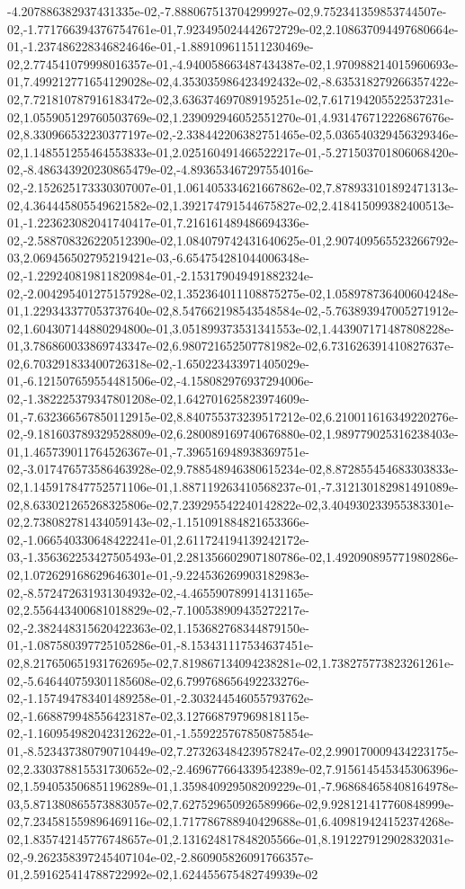 -4.207886382937431335e-02,-7.888067513704299927e-02,9.752341359853744507e-02,-1.771766394376754761e-01,7.923495024442672729e-02,2.108637094497680664e-01,-1.237486228346824646e-01,-1.889109611511230469e-02,2.774541079998016357e-01,-4.940058663487434387e-02,1.970988214015960693e-01,7.499212771654129028e-02,4.353035986423492432e-02,-8.635318279266357422e-02,7.721810787916183472e-02,3.636374697089195251e-02,7.617194205522537231e-02,1.055905129760503769e-02,1.239092946052551270e-01,4.931476712226867676e-02,8.330966532230377197e-02,-2.338442206382751465e-02,5.036540329456329346e-02,1.148551255464553833e-01,2.025160491466522217e-01,-5.271503701806068420e-02,-8.486343920230865479e-02,-4.893653467297554016e-02,-2.152625173330307007e-01,1.061405334621667862e-02,7.878933101892471313e-02,4.364445805549621582e-02,1.392174791544675827e-02,2.418415099382400513e-01,-1.223623082041740417e-01,7.216161489486694336e-02,-2.588708326220512390e-02,1.084079742431640625e-01,2.907409565523266792e-03,2.069456502795219421e-03,-6.654754281044006348e-02,-1.229240819811820984e-01,-2.153179049491882324e-02,-2.004295401275157928e-02,1.352364011108875275e-02,1.058978736400604248e-01,1.229343377053737640e-02,8.547662198543548584e-02,-5.763893947005271912e-02,1.604307144880294800e-01,3.051899373531341553e-02,1.443907171487808228e-01,3.786860033869743347e-02,6.980721652507781982e-02,6.731626391410827637e-02,6.703291833400726318e-02,-1.650223433971405029e-01,-6.121507659554481506e-02,-4.158082976937294006e-02,-1.382225379347801208e-02,1.642701625823974609e-01,-7.632366567850112915e-02,8.840755373239517212e-02,6.210011616349220276e-02,-9.181603789329528809e-02,6.280089169740676880e-02,1.989779025316238403e-01,1.465739011764526367e-01,-7.396516948938369751e-02,-3.017476573586463928e-02,9.788548946380615234e-02,8.872855454683303833e-02,1.145917847752571106e-01,1.887119263410568237e-01,-7.312130182981491089e-02,8.633021265268325806e-02,7.239295542240142822e-02,3.404930233955383301e-02,2.738082781434059143e-02,-1.151091884821653366e-02,-1.066540330648422241e-01,2.611724194139242172e-03,-1.356362253427505493e-01,2.281356602907180786e-02,1.492090895771980286e-02,1.072629168629646301e-01,-9.224536269903182983e-02,-8.572472631931304932e-02,-4.465590789914131165e-02,2.556443400681018829e-02,-7.100538909435272217e-02,-2.382448315620422363e-02,1.153682768344879150e-01,-1.087580397725105286e-01,-8.153431117534637451e-02,8.217650651931762695e-02,7.819867134094238281e-02,1.738275773823261261e-02,-5.646440759301185608e-02,6.799768656492233276e-02,-1.157494783401489258e-01,-2.303244546055793762e-02,-1.668879948556423187e-02,3.127668797969818115e-02,-1.160954982042312622e-01,-1.559225767850875854e-01,-8.523437380790710449e-02,7.273263484239578247e-02,2.990170009434223175e-02,2.330378815531730652e-02,-2.469677664339542389e-02,7.915614545345306396e-02,1.594053506851196289e-01,1.359840929508209229e-01,-7.968684658408164978e-03,5.871380865573883057e-02,7.627529650926589966e-02,9.928121417760848999e-02,7.234581559896469116e-02,1.717786788940429688e-01,6.409819424152374268e-02,1.835742145776748657e-01,2.131624817848205566e-01,8.191227912902832031e-02,-9.262358397245407104e-02,-2.860905826091766357e-01,2.591625414788722992e-02,1.624455675482749939e-02
